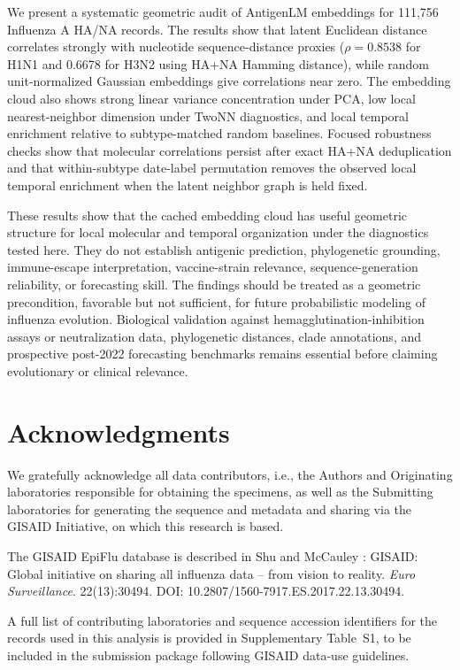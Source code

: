 \documentclass[11pt]{article}
\begin{document}
We present a systematic geometric audit of AntigenLM embeddings for 111,756 Influenza A HA/NA records. The results show that latent Euclidean distance correlates strongly with nucleotide sequence-distance proxies ($\rho=0.8538$ for H1N1 and 0.6678 for H3N2 using HA+NA Hamming distance), while random unit-normalized Gaussian embeddings give correlations near zero. The embedding cloud also shows strong linear variance concentration under PCA, low local nearest-neighbor dimension under TwoNN diagnostics, and local temporal enrichment relative to subtype-matched random baselines. Focused robustness checks show that molecular correlations persist after exact HA+NA deduplication and that within-subtype date-label permutation removes the observed local temporal enrichment when the latent neighbor graph is held fixed.

These results show that the cached embedding cloud has useful geometric structure for local molecular and temporal organization under the diagnostics tested here. They do not establish antigenic prediction, phylogenetic grounding, immune-escape interpretation, vaccine-strain relevance, sequence-generation reliability, or forecasting skill. The findings should be treated as a geometric precondition, favorable but not sufficient, for future probabilistic modeling of influenza evolution. Biological validation against hemagglutination-inhibition assays or neutralization data, phylogenetic distances, clade annotations, and prospective post-2022 forecasting benchmarks remains essential before claiming evolutionary or clinical relevance.

\section*{Acknowledgments}

We gratefully acknowledge all data contributors, i.e., the Authors and Originating laboratories responsible for obtaining the specimens, as well as the Submitting laboratories for generating the sequence and metadata and sharing via the GISAID Initiative, on which this research is based.

The GISAID EpiFlu database is described in Shu and McCauley \cite{shu2017gisaid}: GISAID: Global initiative on sharing all influenza data -- from vision to reality. \emph{Euro Surveillance}. 22(13):30494. DOI: 10.2807/1560-7917.ES.2017.22.13.30494.

A full list of contributing laboratories and sequence accession identifiers for the records used in this analysis is provided in Supplementary Table~S1, to be included in the submission package following GISAID data-use guidelines.



\end{document}
